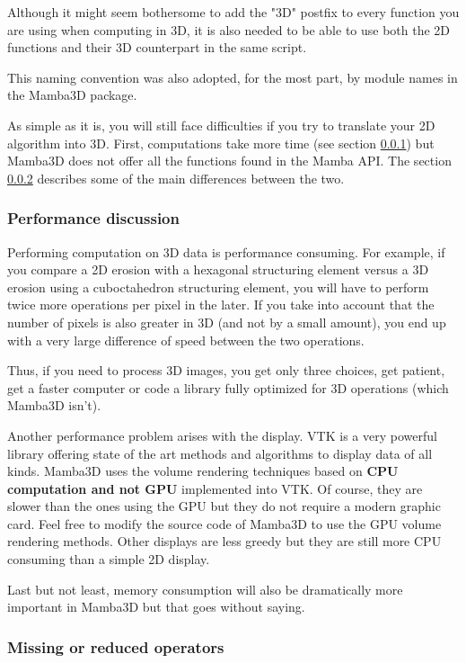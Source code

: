 \documentclass[a4paper,10pt,oneside]{article}
\begin{document}
Although it might seem bothersome to add the "3D" postfix to every
function you are using when computing in 3D, it is also needed to be able to
use both the 2D functions and their 3D counterpart in the same script.

This naming convention was also adopted, for the most part, by module
names in the Mamba3D package.

As simple as it is, you will still face difficulties if you try to translate
your 2D algorithm into 3D. First, computations take more time (see section
\ref{cha:perfo3D}) but Mamba3D does not offer all the functions found in
the Mamba API. The section \ref{cha:missing3D} describes some of the 
main differences between the two.

\subsubsection{Performance discussion}
\label{cha:perfo3D}

Performing computation on 3D data is performance consuming. For example, if
you compare a 2D erosion with a hexagonal structuring element versus a 3D
erosion using a cuboctahedron structuring element, you will have to perform
twice more operations per pixel in the later. If you take into account that
the number of pixels is also greater in 3D (and not by a small amount), you end
up with a very large difference of speed between the two operations.

Thus, if you need to process 3D images, you get only three choices, get patient, 
get a faster computer or code a library fully optimized for 3D operations 
(which Mamba3D isn't).

Another performance problem arises with the display. VTK is a very powerful
library offering state of the art methods and algorithms to display 
data of all kinds. Mamba3D uses the volume rendering techniques based on 
\textbf{CPU computation and not GPU} implemented into VTK. Of course, they
are slower than the ones using the GPU but they do not require a modern
graphic card. Feel free to modify the source code of Mamba3D to use the
GPU volume rendering methods. Other displays are less greedy but they
are still more CPU consuming than a simple 2D display.

Last but not least, memory consumption will also be dramatically more important
in Mamba3D but that goes without saying.

\subsubsection{Missing or reduced operators}
\label{cha:missing3D}
\end{document}
